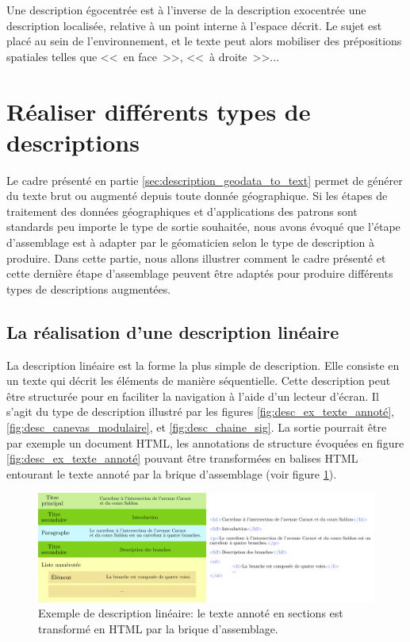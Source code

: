 \newpar{}

Une description égocentrée est à l'inverse de la description exocentrée une description localisée, relative à un point interne à l'espace décrit. Le sujet est placé au sein de l'environnement, et le texte peut alors mobiliser des prépositions spatiales telles que <<~en face~>>, <<~à droite~>>...

\section{Réaliser différents types de descriptions}

\label{sec:description_cas_utilisation}

Le cadre présenté en partie \ref{sec:description_geodata_to_text} permet de générer du texte brut ou augmenté depuis toute donnée géographique. Si les étapes de traitement des données géographiques et d'applications des patrons sont standards peu importe le type de sortie souhaitée, nous avons évoqué que l'étape d'assemblage est à adapter par le géomaticien selon le type de description à produire. Dans cette partie, nous allons illustrer comment le cadre présenté et cette dernière étape d'assemblage peuvent être adaptés pour produire différents types de descriptions augmentées.

\subsection{La réalisation d'une description linéaire}

\label{sec:description_textuelle}

La description linéaire est la forme la plus simple de description. Elle consiste en un texte qui décrit les éléments de manière séquentielle. Cette description peut être structurée pour en faciliter la navigation à l'aide d'un lecteur d'écran. Il s'agit du type de description illustré par les figures \ref{fig:desc_ex_texte_annoté}, \ref{fig:desc_canevas_modulaire}, et \ref{fig:desc_chaine_sig}. La sortie pourrait être par exemple un document HTML, les annotations de structure évoquées en figure \ref{fig:desc_ex_texte_annoté} pouvant être transformées en balises HTML entourant le texte annoté par la brique d'assemblage (voir figure \ref{fig:desc_ex_desc_lineaire}).

\begin{figure}[ht]
    \centering
    \includegraphics[width=\textwidth]{images/description/exemple_desc_lineaire.pdf
    }
    \caption[Exemple de description linéaire.]{Exemple de description linéaire: le texte annoté en sections est transformé en HTML par la brique d'assemblage.}
    \label{fig:desc_ex_desc_lineaire}
\end{figure}

